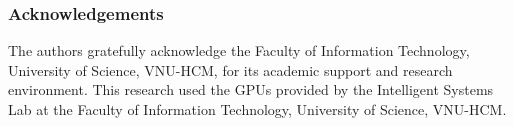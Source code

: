 \subsubsection*{Acknowledgements}

The authors gratefully acknowledge the Faculty of Information Technology,
University of Science, VNU-HCM, for its academic support and research
environment. This research used the GPUs provided by the Intelligent Systems Lab
at the Faculty of Information Technology, University of Science, VNU-HCM.
